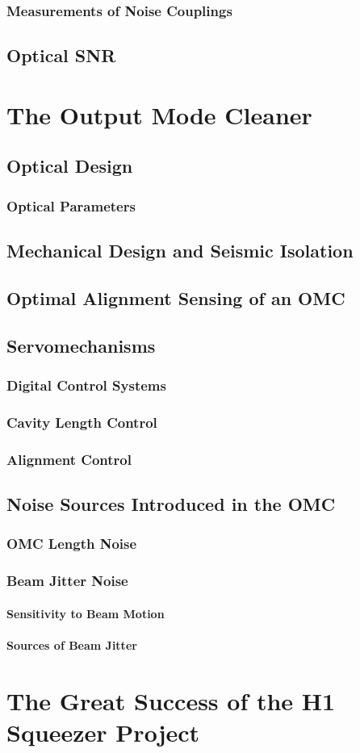 \documentclass[12pt,vi,twoside]{mitthesis}
\begin{document}
\subsection{Measurements of Noise Couplings}
\section{Optical SNR}

\chapter{The Output Mode Cleaner}
\section{Optical Design}
\subsection{Optical Parameters}
\section{Mechanical Design and Seismic Isolation}
\section{Optimal Alignment Sensing of an OMC}
\section{Servomechanisms}
\subsection{Digital Control Systems}
\subsection{Cavity Length Control}
\subsection{Alignment Control}
\section{Noise Sources Introduced in the OMC}
\subsection{OMC Length Noise}
\subsection{Beam Jitter Noise}
\subsubsection{Sensitivity to Beam Motion}
\subsubsection{Sources of Beam Jitter}

\chapter{The Great Success of the H1 Squeezer Project}

\appendix



\end{document}
